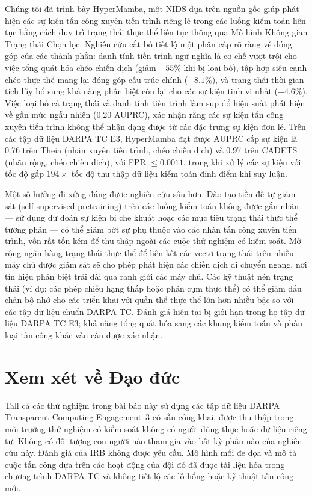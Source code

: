 \documentclass[letterpaper,twocolumn,10pt]{article}
\begin{document}
Chúng tôi đã trình bày HyperMamba, một NIDS dựa trên nguồn gốc giúp phát hiện các sự kiện tấn công xuyên tiến trình riêng lẻ trong các luồng kiểm toán liên tục bằng cách duy trì trạng thái thực thể liên tục thông qua Mô hình Không gian Trạng thái Chọn lọc. Nghiên cứu cắt bỏ tiết lộ một phân cấp rõ ràng về đóng góp của các thành phần: danh tính tiến trình ngữ nghĩa là cơ chế vượt trội cho việc tổng quát hóa chéo chiến dịch (giảm $-55\%$ khi bị loại bỏ), tập hợp siêu cạnh chéo thực thể mang lại đóng góp cấu trúc chính ($-8.1\%$), và trạng thái thời gian tích lũy bổ sung khả năng phân biệt còn lại cho các sự kiện tinh vi nhất ($-4.6\%$). Việc loại bỏ cả trạng thái và danh tính tiến trình làm sụp đổ hiệu suất phát hiện về gần mức ngẫu nhiên (0.20 AUPRC), xác nhận rằng các sự kiện tấn công xuyên tiến trình không thể nhận dạng được từ các đặc trưng sự kiện đơn lẻ. Trên các tập dữ liệu DARPA TC E3, HyperMamba đạt được AUPRC cấp sự kiện là 0.76 trên Theia (nhãn xuyên tiến trình, chéo chiến dịch) và 0.97 trên CADETS (nhãn rộng, chéo chiến dịch), với FPR $\leq 0.0011$, trong khi xử lý các sự kiện với tốc độ gấp $194\times$ tốc độ thu thập dữ liệu kiểm toán đỉnh điểm khi suy luận.

Một số hướng đi xứng đáng được nghiên cứu sâu hơn. Đào tạo tiền đề tự giám sát (self-supervised pretraining) trên các luồng kiểm toán không được gắn nhãn --- sử dụng dự đoán sự kiện bị che khuất hoặc các mục tiêu trạng thái thực thể tương phản --- có thể giảm bớt sự phụ thuộc vào các nhãn tấn công xuyên tiến trình, vốn rất tốn kém để thu thập ngoài các cuộc thử nghiệm có kiểm soát. Mở rộng ngân hàng trạng thái thực thể để liên kết các vectơ trạng thái trên nhiều máy chủ được giám sát sẽ cho phép phát hiện các chiến dịch di chuyển ngang, nơi tín hiệu phân biệt trải dài qua ranh giới các máy chủ. Các kỹ thuật nén trạng thái (ví dụ: các phép chiếu hạng thấp hoặc phân cụm thực thể) có thể giảm dấu chân bộ nhớ cho các triển khai với quần thể thực thể lớn hơn nhiều bậc so với các tập dữ liệu chuẩn DARPA TC. Đánh giá hiện tại bị giới hạn trong họ tập dữ liệu DARPA TC E3; khả năng tổng quát hóa sang các khung kiểm toán và phân loại tấn công khác vẫn cần được xác nhận.

\section*{Xem xét về Đạo đức}

Tall cả các thử nghiệm trong bài báo này sử dụng các tập dữ liệu DARPA Transparent Computing Engagement~3 có sẵn công khai, được thu thập trong môi trường thử nghiệm có kiểm soát không có người dùng thực hoặc dữ liệu riêng tư. Không có đối tượng con người nào tham gia vào bất kỳ phần nào của nghiên cứu này. Đánh giá của IRB không được yêu cầu. Mô hình mối đe dọa và mô tả cuộc tấn công dựa trên các hoạt động của đội đỏ đã được tài liệu hóa trong chương trình DARPA TC và không tiết lộ các lỗ hổng hoặc kỹ thuật tấn công mới.
\end{document}
